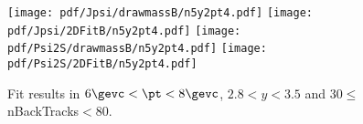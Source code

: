 \begin{figure}[H]
\begin{center}
\texttt{[image: pdf/Jpsi/drawmassB/n5y2pt4.pdf]}
\texttt{[image: pdf/Jpsi/2DFitB/n5y2pt4.pdf]}
\vspace*{-0.5cm}
\texttt{[image: pdf/Psi2S/drawmassB/n5y2pt4.pdf]}
\texttt{[image: pdf/Psi2S/2DFitB/n5y2pt4.pdf]}
\vspace*{-0.5cm}
\end{center}
\caption{Fit results in $6\gevc<\pt<8\gevc$, $2.8<y<3.5$ and 30$\leq$nBackTracks$<$80.}
\label{Fitn5y2pt4}
\end{figure}
